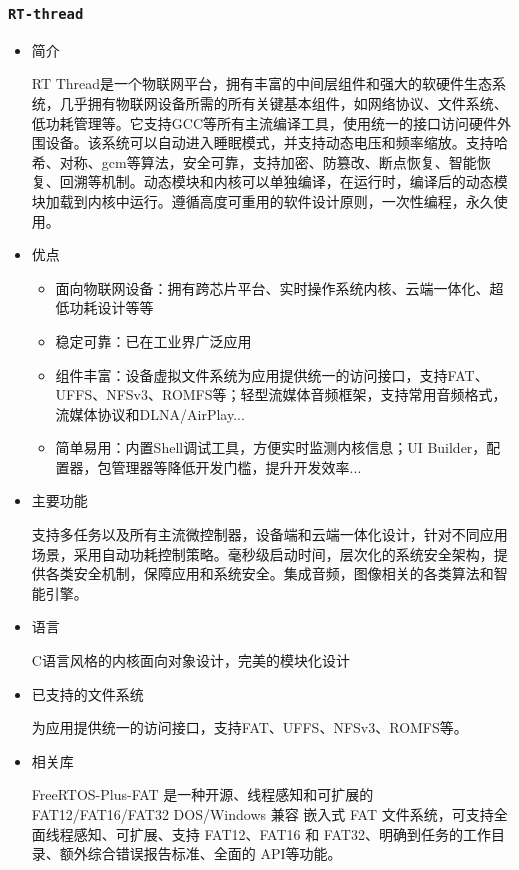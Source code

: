 \documentclass[UTF8,a4paper]{ctexart}
\begin{document}
\subsubsection{\texttt{RT-thread}}
\begin{itemize}
\item 简介

RT Thread是一个物联网平台，拥有丰富的中间层组件和强大的软硬件生态系统，几乎拥有物联网设备所需的所有关键基本组件，如网络协议、文件系统、低功耗管理等。它支持GCC等所有主流编译工具，使用统一的接口访问硬件外围设备。该系统可以自动进入睡眠模式，并支持动态电压和频率缩放。支持哈希、对称、gcm等算法，安全可靠，支持加密、防篡改、断点恢复、智能恢复、回溯等机制。动态模块和内核可以单独编译，在运行时，编译后的动态模块加载到内核中运行。遵循高度可重用的软件设计原则，一次性编程，永久使用。

\item 优点
\begin{itemize}
    \item 面向物联网设备：拥有跨芯片平台、实时操作系统内核、云端一体化、超低功耗设计等等
    \item 稳定可靠：已在工业界广泛应用
    \item 组件丰富：设备虚拟文件系统为应用提供统一的访问接口，支持FAT、UFFS、NFSv3、ROMFS等；轻型流媒体音频框架，支持常用音频格式，流媒体协议和DLNA/AirPlay...
    \item 简单易用：内置Shell调试工具，方便实时监测内核信息；UI Builder，配置器，包管理器等降低开发门槛，提升开发效率...
\end{itemize}
\item 主要功能

支持多任务以及所有主流微控制器，设备端和云端一体化设计，针对不同应用场景，采用自动功耗控制策略。毫秒级启动时间，层次化的系统安全架构，提供各类安全机制，保障应用和系统安全。集成音频，图像相关的各类算法和智能引擎。
\item 语言

C语言风格的内核面向对象设计，完美的模块化设计
\item 已支持的文件系统

为应用提供统一的访问接口，支持FAT、UFFS、NFSv3、ROMFS等。
\item 相关库

FreeRTOS-Plus-FAT 是一种开源、线程感知和可扩展的 FAT12/FAT16/FAT32 DOS/Windows 兼容 嵌入式 FAT 文件系统，可支持全面线程感知、可扩展、支持 FAT12、FAT16 和 FAT32、明确到任务的工作目录、额外综合错误报告标准、全面的 API等功能。
\end{itemize}
\end{document}
